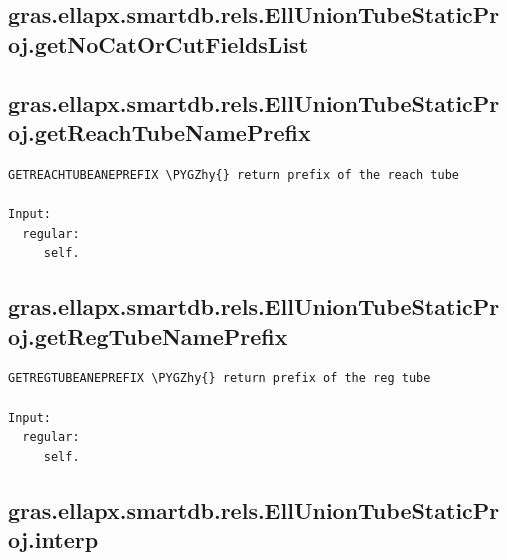 \documentclass[letterpaper,10pt,english]{sphinxmanual}
\def\PYGZhy{\char`\-}
\begin{document}
\subsection{gras.ellapx.smartdb.rels.EllUnionTubeStaticProj.getNoCatOrCutFieldsList}
\label{chap_functions:gras-ellapx-smartdb-rels-elluniontubestaticproj-getnocatorcutfieldslist}

\subsection{gras.ellapx.smartdb.rels.EllUnionTubeStaticProj.getReachTubeNamePrefix}
\label{chap_functions:gras-ellapx-smartdb-rels-elluniontubestaticproj-getreachtubenameprefix}
\begin{Verbatim}[commandchars=\\\{\}]
GETREACHTUBEANEPREFIX \PYGZhy{} return prefix of the reach tube

Input:
  regular:
     self.
\end{Verbatim}


\subsection{gras.ellapx.smartdb.rels.EllUnionTubeStaticProj.getRegTubeNamePrefix}
\label{chap_functions:gras-ellapx-smartdb-rels-elluniontubestaticproj-getregtubenameprefix}
\begin{Verbatim}[commandchars=\\\{\}]
GETREGTUBEANEPREFIX \PYGZhy{} return prefix of the reg tube

Input:
  regular:
     self.
\end{Verbatim}


\subsection{gras.ellapx.smartdb.rels.EllUnionTubeStaticProj.interp}
\label{chap_functions:gras-ellapx-smartdb-rels-elluniontubestaticproj-interp}
\end{document}
